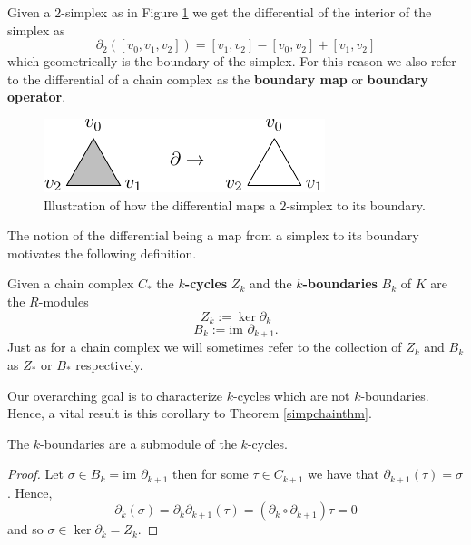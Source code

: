 \begin{example}
Given a $2$-simplex as in Figure \ref{2simplex} we get the differential of the interior of the simplex as \[\partial_{2}([v_{0},v_{1},v_{2}])=[v_{1},v_{2}]-[v_{0},v_{2}]+[v_{1},v_{2}]\] which geometrically is the boundary of the simplex. For this reason we also refer to the differential of a chain complex as the \textbf{boundary map} or \textbf{boundary operator}.
\begin{figure}[ht]
  \centering
  \includegraphics[scale=2]{partialtri.pdf}
  \caption{\label{2simplex} Illustration of how the differential maps a $2$-simplex to its boundary.}
\end{figure}
\end{example}
The notion of the differential being a map from a simplex to its boundary motivates the following definition.
\begin{definition}
  Given a chain complex $C_{*}$ the \textbf{$k$-cycles} $Z_{k}$  and the \textbf{$k$-boundaries} $B_{k}$ of $K$ are the $R$-modules
  \[ Z_{k} := \ker \partial_{k}\]
  \[ B_{k} := \textrm{im } \partial_{k+1}.\]
  Just as for a chain complex we will sometimes refer to the collection of $Z_{k}$ and $B_{k}$ as $Z_{*}$ or $B_{*}$ respectively.
\end{definition}
Our overarching goal is to characterize $k$-cycles which are not $k$-boundaries. Hence, a vital result is this corollary to Theorem \ref{simpchainthm}.

\begin{corollary} \label{submodulecycle}
  The $k$-boundaries are a submodule of the $k$-cycles.
\end{corollary}


\begin{proof}
Let $\sigma \in B_{k} = \textrm{im } \partial_{k+1}$ then for some $\tau \in C_{k+1}$ we have that $\partial_{k+1}(\tau)=\sigma$. Hence,
\[ \partial_{k}(\sigma) = \partial_{k} \partial_{k+1}(\tau) = (\partial_{k} \circ \partial_{k+1}) \tau = 0\]
and so $\sigma \in \ker \partial_{k} = Z_{k}$.
\end{proof}


